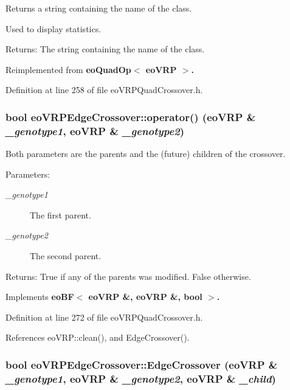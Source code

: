 Returns a string containing the name of the class. 

Used to display statistics. \begin{Desc}
\item[Returns:]The string containing the name of the class. \end{Desc}


Reimplemented from \bf{eo\-Quad\-Op$<$ eo\-VRP $>$}.

Definition at line 258 of file eo\-VRPQuad\-Crossover.h.
\subsubsection{\setlength{\rightskip}{0pt plus 5cm}bool eo\-VRPEdge\-Crossover::operator() (\bf{eo\-VRP} \& {\em \_\-genotype1}, \bf{eo\-VRP} \& {\em \_\-genotype2})\hspace{0.3cm}{\tt  [inline, virtual]}}\label{classeo_v_r_p_edge_crossover_518856969ec708a73e728d36ddf01d1b}


Both parameters are the parents and the (future) children of the crossover. 

\begin{Desc}
\item[Parameters:]
\begin{description}
\item[{\em \_\-genotype1}]The first parent. \item[{\em \_\-genotype2}]The second parent. \end{description}
\end{Desc}
\begin{Desc}
\item[Returns:]True if any of the parents was modified. False otherwise. \end{Desc}


Implements \bf{eo\-BF$<$ eo\-VRP \&, eo\-VRP \&, bool $>$}.

Definition at line 272 of file eo\-VRPQuad\-Crossover.h.

References eo\-VRP::clean(), and Edge\-Crossover().
\subsubsection{\setlength{\rightskip}{0pt plus 5cm}bool eo\-VRPEdge\-Crossover::Edge\-Crossover (\bf{eo\-VRP} \& {\em \_\-genotype1}, \bf{eo\-VRP} \& {\em \_\-genotype2}, \bf{eo\-VRP} \& {\em \_\-child})\hspace{0.3cm}{\tt  [inline, private]}}\label{classeo_v_r_p_edge_crossover_389bd29cab9e12915d0d5c4af80343d7}


